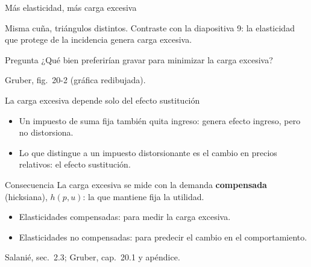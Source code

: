 \documentclass[aspectratio=169,11pt]{beamer}
\newcommand{\fuente}[1]{\par\vfill{\small\color{cGris}#1\par}}
\newcommand{\ejes}[4]{%
  \draw[eje] (0,0) -- (#1,0) node[below] {#3};
  \draw[eje] (0,0) -- (0,#2) node[left] {#4};}
\begin{document}
\begin{frame}{Más elasticidad, más carga excesiva}
  \centering
  \par
  Misma cuña, triángulos distintos. Contraste con la diapositiva 9: la elasticidad que protege de la incidencia genera carga excesiva.
  \pause
  \begin{alertblock}{Pregunta}
    ¿Qué bien preferirían gravar para minimizar la carga excesiva?
  \end{alertblock}
  \fuente{Gruber, fig.~20-2 (gráfica redibujada).}
\end{frame}

\begin{frame}{La carga excesiva depende solo del efecto sustitución}
  \begin{itemize}
    \item Un impuesto de suma fija también quita ingreso: genera efecto ingreso, pero no distorsiona.
    \item Lo que distingue a un impuesto distorsionante es el cambio en precios relativos: el efecto sustitución.
  \end{itemize}
  \pause
  \begin{block}{Consecuencia}
    La carga excesiva se mide con la demanda \textbf{compensada} (hicksiana), $h(p,u)$: la que mantiene fija la utilidad.
  \end{block}
  \pause
  \begin{itemize}
    \item Elasticidades compensadas: para medir la carga excesiva.
    \item Elasticidades no compensadas: para predecir el cambio en el comportamiento.
  \end{itemize}
  \fuente{Salanié, sec.~2.3; Gruber, cap.~20.1 y apéndice.}
\end{frame}
\end{document}
